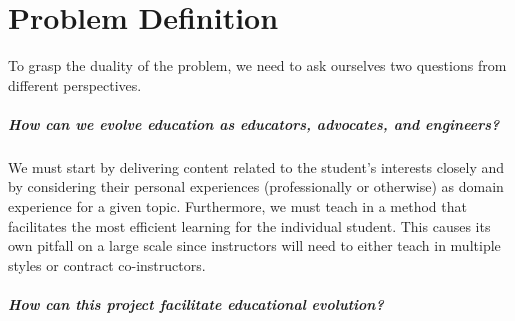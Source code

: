 \chapter{Problem Definition}
\label{ch:problemdefinition}



To grasp the duality of the problem, we need to ask ourselves two questions from different perspectives.

\paragraph{How can we evolve education as educators, advocates, and engineers?} 

We must start by delivering content related to the student's interests closely and by considering their personal experiences (professionally or otherwise) as domain experience for a given topic. Furthermore, we must teach in a method that facilitates the most efficient learning for the individual student. This causes its own pitfall on a large scale since instructors will need to either teach in multiple styles or contract co-instructors.


\paragraph{How can this project facilitate educational evolution?}

